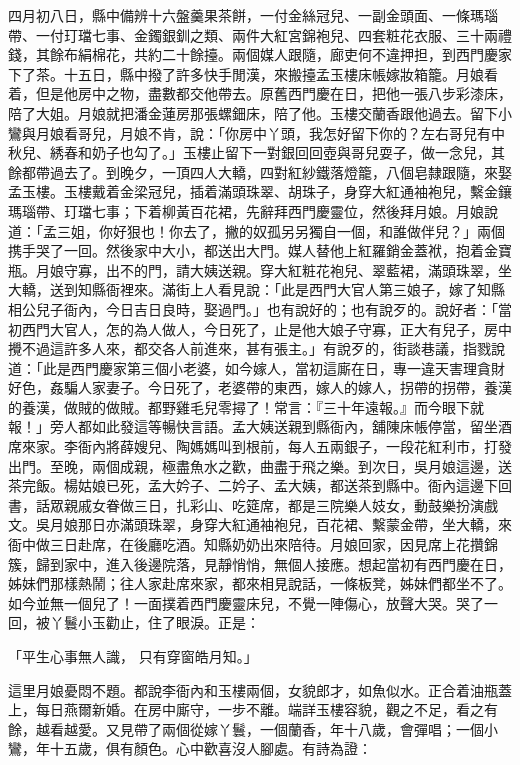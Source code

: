 \begin{showcontents}{}
四月初八日，縣中備辨十六盤羹果茶餅，一付金絲冠兒、一副金頭面、一條瑪瑙帶、一付玎璫七事、金鐲銀釧之類、兩件大紅宮錦袍兒、四套粧花衣服、三十兩禮錢，其餘布絹棉花，共約二十餘擡。兩個媒人跟隨，廊吏何不違押担，到西門慶家下了茶。十五日，縣中撥了許多快手閒漢，來搬擡孟玉樓床帳嫁妝箱籠。月娘看着，但是他房中之物，盡數都交他帶去。原舊西門慶在日，把他一張八步彩漆床，陪了大姐。月娘就把潘金蓮房那張螺鈿床，陪了他。玉樓交蘭香跟他過去。留下小鸞與月娘看哥兒，月娘不肯，說：「你房中丫頭，我怎好留下你的？左右哥兒有中秋兒、綉春和奶子也勾了。」玉樓止留下一對銀回回壺與哥兒耍子，做一念兒，其餘都帶過去了。到晚夕，一頂四人大轎，四對紅紗鐵落燈籠，八個皂隸跟隨，來娶孟玉樓。玉樓戴着金梁冠兒，插着滿頭珠翠、胡珠子，身穿大紅通袖袍兒，繫金鑲瑪瑙帶、玎璫七事；下着柳黃百花裙，先辭拜西門慶靈位，然後拜月娘。月娘說道：「孟三姐，你好狠也！你去了，撇的奴孤另另獨自一個，和誰做伴兒？」兩個携手哭了一回。然後家中大小，都送出大門。媒人替他上紅羅銷金蓋袱，抱着金寶瓶。月娘守寡，出不的門，請大姨送親。穿大紅粧花袍兒、翠藍裙，滿頭珠翠，坐大轎，送到知縣衙裡來。滿街上人看見說：「此是西門大官人第三娘子，嫁了知縣相公兒子衙內，今日吉日良時，娶過門。」也有說好的；也有說歹的。說好者：「當初西門大官人，怎的為人做人，今日死了，止是他大娘子守寡，正大有兒子，房中攪不過這許多人來，都交各人前進來，甚有張主。」有說歹的，街談巷議，指戮說道：「此是西門慶家第三個小老婆，如今嫁人，當初這廝在日，專一違天害理貪財好色，姦騙人家妻子。今日死了，老婆帶的東西，嫁人的嫁人，拐帶的拐帶，養漢的養漢，做賊的做賊。都野雞毛兒零撏了！常言：『三十年遠報。』而今眼下就報！」旁人都如此發這等暢快言語。孟大姨送親到縣衙內，舖陳床帳停當，留坐酒席來家。李衙內將薛嫂兒、陶媽媽叫到根前，每人五兩銀子，一段花紅利市，打發出門。至晚，兩個成親，極盡魚水之歡，曲盡于飛之樂。到次日，吳月娘這邊，送茶完飯。楊姑娘已死，孟大妗子、二妗子、孟大姨，都送茶到縣中。衙內這邊下回書，話眾親戚女眷做三日，扎彩山、吃筵席，都是三院樂人妓女，動鼓樂扮演戲文。吳月娘那日亦滿頭珠翠，身穿大紅通袖袍兒，百花裙、繫蒙金帶，坐大轎，來衙中做三日赴席，在後廳吃酒。知縣奶奶出來陪待。月娘回家，因見席上花攢錦簇，歸到家中，進入後邊院落，見靜悄悄，無個人接應。想起當初有西門慶在日，姊妹們那樣熱鬧；往人家赴席來家，都來相見說話，一條板凳，姊妹們都坐不了。如今並無一個兒了！一面撲着西門慶靈床兒，不覺一陣傷心，放聲大哭。哭了一回，被丫鬟小玉勸止，住了眼淚。正是：

「平生心事無人識，  只有穿窗皓月知。」

這里月娘憂悶不題。都說李衙內和玉樓兩個，女貌郎才，如魚似水。正合着油瓶蓋上，每日燕爾新婚。在房中廝守，一步不離。端詳玉樓容貌，觀之不足，看之有餘，越看越愛。又見帶了兩個從嫁丫鬟，一個蘭香，年十八歲，會彈唱；一個小鸞，年十五歲，俱有顏色。心中歡喜沒人腳處。有詩為證：


\end{showcontents}
